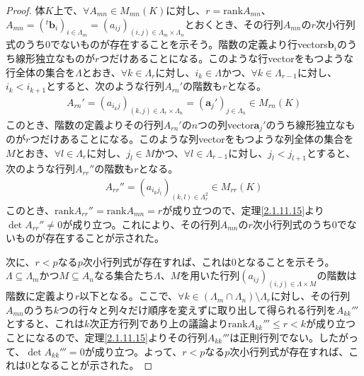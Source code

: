 \documentclass[dvipdfmx]{jsarticle}
\begin{document}
\begin{proof}
体$K$上で、$\forall A_{mn} \in M_{mn}(K)$に対し、$r = {\mathrm{rank}}A_{mn}$、$A_{mn} = \left(^{t}\mathbf{b}_{i} \right)_{i \in \varLambda_{m}} = \left( a_{ij} \right)_{(i,j) \in \varLambda_{m} \times \varLambda_{n}}$とおくとき、その行列$A_{mn}$の$r$次小行列式のうち$0$でないものが存在することを示そう。階数の定義より行vectors$\mathbf{b}_{i}$のうち線形独立なものが$r$つだけあることになる。このような行vectorをもつような行全体の集合を$\varLambda$とおき、$\forall k \in \varLambda_{r}$に対し、$i_{k} \in \varLambda$かつ、$\forall k \in \varLambda_{r - 1}$に対し、$i_{k} < i_{k + 1}$とすると、次のような行列$A_{rn}'$の階数も$r$となる。
\begin{align*}
A_{rn}' = \left( a_{i_{k}j} \right)_{(k,j) \in \varLambda_{r} \times \varLambda_{n}} = \left( \mathbf{a}_{j}' \right)_{j \in \varLambda_{n}} \in M_{rn}(K)
\end{align*}
このとき、階数の定義よりその行列$A_{rn}'$の$n$つの列vector$\mathbf{a}_{j}'$のうち線形独立なものが$r$つだけあることになる。このような列vectorをもつような列全体の集合を$M$とおき、$\forall l \in \varLambda_{r}$に対し、$j_{l} \in M$かつ、$\forall l \in \varLambda_{r - 1}$に対し、$j_{l} < j_{l + 1}$とすると、次のような行列$A_{rr}''$の階数も$r$となる。
\begin{align*}
A_{rr}'' = \left( a_{i_{k}j_{l}} \right)_{(k,l) \in \varLambda_{r}^{2}} \in M_{rr}(K)
\end{align*}
このとき、${\mathrm{rank}}A_{rr}'' = {\mathrm{rank}}A_{mn} = r$が成り立つので、定理\ref{2.1.11.15}より$\det A_{rr}'' \neq 0$が成り立つ。これにより、その行列$A_{mn}$の$r$次小行列式のうち$0$でないものが存在することが示された。\par
次に、$r < p$なる$p$次小行列式が存在すれば、これは$0$となることを示そう。$\varLambda \subseteq \varLambda_{m}$かつ$M \subseteq A_{n}$なる集合たち$\varLambda$、$M$を用いた行列$\left( a_{ij} \right)_{(i,j) \in \varLambda \times M}$の階数は階数に定義より$r$以下となる。ここで、$\forall k \in \left( \varLambda_{m} \cap \varLambda_{n} \right) \setminus \varLambda_{r}$に対し、その行列$A_{mn}$のうち$k$つの行々と列々だけ順序を変えずに取り出して得られる行列を$A_{kk}'''$とすると、これは$k$次正方行列であり上の議論より${\mathrm{rank}}A_{kk}''' \leq r < k$が成り立つことになるので、定理\ref{2.1.11.15}よりその行列$A_{kk}'''$は正則行列でない。したがって、$\det A_{kk}''' = 0$が成り立つ。よって、$r < p$なる$p$次小行列式が存在すれば、これは$0$となることが示された。
\end{proof}
\end{document}
